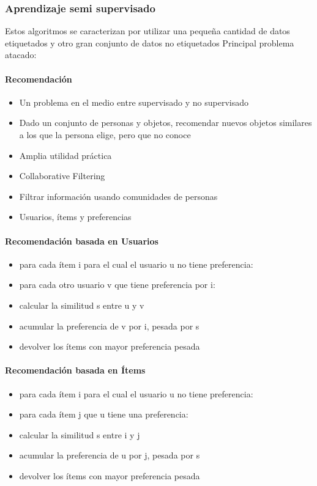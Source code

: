 \documentclass[a4paper,10pt]{article}
\begin{document}
\subsubsection{Aprendizaje semi supervisado}

Estos algoritmos se caracterizan por utilizar una pequeña cantidad de datos etiquetados y otro gran conjunto de datos no etiquetados
Principal problema atacado:
\paragraph {Recomendación}
\begin{itemize}
  \item Un problema en el medio entre supervisado y no supervisado
  \item Dado un conjunto de personas y objetos, recomendar nuevos objetos similares a los que la persona elige, pero que no conoce
  \item Amplia utilidad práctica
  \item Collaborative Filtering
  \item Filtrar información usando comunidades de personas
  \item Usuarios, ítems y preferencias
\end{itemize}
\paragraph {Recomendación basada en Usuarios}
  \begin{itemize}
    \item para cada ítem i para el cual el usuario u no tiene preferencia:
    \item para cada otro usuario v que tiene preferencia por i:
    \item calcular la similitud s entre u y v
    \item acumular la preferencia de v por i, pesada por s
    \item devolver los ítems con mayor preferencia pesada
  \end{itemize}
\paragraph {Recomendación basada en Ítems}
  \begin{itemize}
    \item para cada ítem i para el cual el usuario u no tiene preferencia:
    \item para cada ítem j que u tiene una preferencia:
    \item calcular la similitud s entre i y j
    \item acumular la preferencia de u por j, pesada por s
    \item devolver los ítems con mayor preferencia pesada
  \end{itemize}
\end{document}
